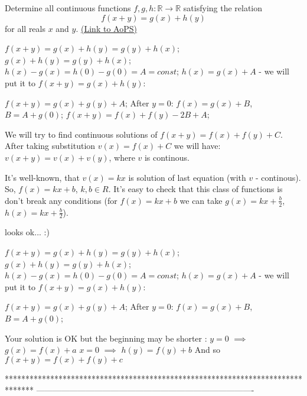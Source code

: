 \begin{problem}
	Determine all continuous functions $f,g,h: \mathbb R \to \mathbb R$ satisfying the relation \[f(x+y)=g(x)+h(y)\] for all reals $x$ and $y$.
	\flushright \href{https://artofproblemsolving.com/community/c6h285633}{(Link to AoPS)}
\end{problem}



\begin{solution}
	$ f(x+y)=g(x)+h(y)=g(y)+h(x)$;
$ g(x)+h(y)=g(y)+h(x)$;
$ h(x)-g(x)=h(0)-g(0)=A=const$;
$ h(x)=g(x)+A$ - we will put it to $ f(x+y)=g(x)+h(y)$:

$ f(x+y)=g(x)+g(y)+A$;
After $ y=0$: $ f(x)=g(x)+B$, $ B=A+g(0)$;
$ f(x+y)=f(x)+f(y)-2B+A$;

We will try to find continuous solutions of $ f(x+y)=f(x)+f(y)+C$.
After taking substitution $ v(x)=f(x)+C$ we will have:
$ v(x+y)=v(x)+v(y)$, where $ v$ is continous.

It's well-known, that $ v(x)=kx$ is solution of last equation (with $ v$ - continous).
So, $ f(x)=kx+b$, $ k, b \in R$.
It's easy to check that this class of functions is don't  break any conditions (for $ f(x)=kx+b$ we can take $ g(x)=kx+\frac{b}{2}$, $ h(x)=kx+\frac{b}{2}$).
\end{solution}



\begin{solution}
	looks ok... :)
\end{solution}



\begin{solution}
	\begin{tcolorbox}$ f(x + y) = g(x) + h(y) = g(y) + h(x)$;
$ g(x) + h(y) = g(y) + h(x)$;
$ h(x) - g(x) = h(0) - g(0) = A = const$;
$ h(x) = g(x) + A$ - we will put it to $ f(x + y) = g(x) + h(y)$:

$ f(x + y) = g(x) + g(y) + A$;
After $ y = 0$: $ f(x) = g(x) + B$, $ B = A + g(0)$;
\end{tcolorbox}

Your solution is OK but the beginning may be shorter :
$ y=0$ $ \implies$ $ g(x)=f(x)+a$
$ x=0$ $ \implies$ $ h(y)=f(y)+b$
And so $ f(x+y)=f(x)+f(y)+c$
\end{solution}
*******************************************************************************
-------------------------------------------------------------------------------

